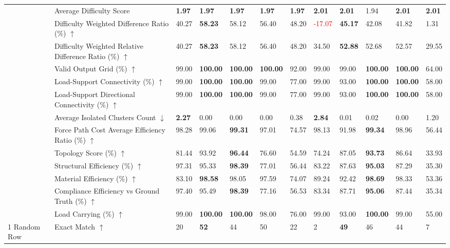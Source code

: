 \begin{table}[!h]
{\begin{tabular}{lllllll|lllll}
 & Average Difficulty Score & \textbf{1.97} & \textbf{1.97} & \textbf{1.97} & \textbf{1.97} & \textbf{1.97} & \textbf{2.01} & \textbf{2.01} & 1.94 & \textbf{2.01} & \textbf{2.01} \\
 & Difficulty Weighted Difference Ratio (\%) $\uparrow$ & 40.27 & \textbf{58.23} & 58.12 & 56.40 & 48.20 & \textcolor{red}{-17.07} & \textbf{45.17} & 42.08 & 41.82 & 1.31 \\
 & Difficulty Weighted Relative Difference Ratio (\%) $\uparrow$ & 40.27 & \textbf{58.23} & 58.12 & 56.40 & 48.20 & 34.50 & \textbf{52.88} & 52.68 & 52.57 & 29.55 \\
 & Valid Output Grid (\%) $\uparrow$ & 99.00 & \textbf{100.00} & \textbf{100.00} & \textbf{100.00} & 92.00 & 99.00 & 99.00 & \textbf{100.00} & \textbf{100.00} & 64.00 \\
 & Load-Support Connectivity (\%) $\uparrow$ & 99.00 & \textbf{100.00} & \textbf{100.00} & 99.00 & 77.00 & 99.00 & 93.00 & \textbf{100.00} & \textbf{100.00} & 58.00 \\
 & Load-Support Directional Connectivity (\%) $\uparrow$ & 99.00 & \textbf{100.00} & \textbf{100.00} & 99.00 & 77.00 & 99.00 & 93.00 & \textbf{100.00} & \textbf{100.00} & 58.00 \\
 & Average Isolated Clusters Count $\downarrow$ & \textbf{2.27} & 0.00 & 0.00 & 0.00 & 0.38 & \textbf{2.84} & 0.01 & 0.02 & 0.00 & 1.20 \\
 & Force Path Cost Average Efficiency Ratio (\%) $\uparrow$ & 98.28 & 99.06 & \textbf{99.31} & 97.01 & 74.57 & 98.13 & 91.98 & \textbf{99.34} & 98.96 & 56.44 \\
 & Topology Score (\%) $\uparrow$ & 81.44 & 93.92 & \textbf{96.44} & 76.60 & 54.59 & 74.24 & 87.05 & \textbf{93.73} & 86.64 & 33.93 \\
 & Structural Efficiency (\%) $\uparrow$ & 97.31 & 95.33 & \textbf{98.39} & 77.01 & 56.44 & 83.22 & 87.63 & \textbf{95.03} & 87.29 & 35.30 \\
 & Material Efficiency (\%) $\uparrow$ & 83.10 & \textbf{98.58} & 98.05 & 97.59 & 74.07 & 89.24 & 92.42 & \textbf{98.69} & 98.33 & 53.36 \\
 & Compliance Efficiency vs Ground Truth (\%) $\uparrow$ & 97.40 & 95.49 & \textbf{98.39} & 77.16 & 56.53 & 83.34 & 87.71 & \textbf{95.06} & 87.44 & 35.34 \\
 & Load Carrying (\%) $\uparrow$ & 99.00 & \textbf{100.00} & \textbf{100.00} & 98.00 & 76.00 & 99.00 & 93.00 & \textbf{100.00} & 99.00 & 55.00 \\
\midrule
1 Random Row & Exact Match $\uparrow$ & 20 & \textbf{52} & 44 & 50 & 22 & 2 & \textbf{49} & 46 & 44 & 7 \\

\end{tabular}}
\end{table}
